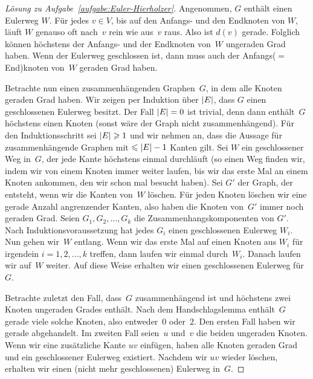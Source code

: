 \begin{proof}[Lösung zu Aufgabe~\ref{aufgabe:Euler-Hierholzer}]
	Angenommen, $G$ enthält einen Eulerweg $W$. Für jedes $v\in V$, bis auf den Anfangs- und den Endknoten von $W$, läuft $W$ genauso oft nach~$v$ rein wie aus~$v$ raus. Also ist $d(v)$ gerade. Folglich können höchstens der Anfangs- und der Endknoten von~$W$ ungeraden Grad haben. Wenn der Eulerweg geschlossen ist, dann muss auch der Anfangs($=$End)knoten von~$W$ geraden Grad haben.
	
	Betrachte nun einen zusammenhängenden Graphen~$G$, in dem alle Knoten geraden Grad haben. Wir zeigen per Induktion über $\abs*{E}$, dass $G$ einen geschlossenen Eulerweg besitzt. Der Fall $\abs*{E}=0$ ist trivial, denn dann enthält~$G$ höchstens einen Knoten (sonst wäre der Graph nicht zusammenhängend). Für den Induktionsschritt sei $\abs*{E}\geqslant 1$ und wir nehmen an, dass die Aussage für zusammenhängende Graphen mit $\leqslant\abs*{E}-1$ Kanten gilt. Sei $W$ ein geschlossener Weg in~$G$, der jede Kante höchstens einmal durchläuft (so einen Weg finden wir, indem wir von einem Knoten immer weiter laufen, bis wir das erste Mal an einem Knoten ankommen, den wir schon mal besucht haben). Sei $G'$ der Graph, der entsteht, wenn wir die Kanten von~$W$ löschen. Für jeden Knoten löschen wir eine gerade Anzahl angrenzender Kanten, also haben die Knoten von~$G'$ immer noch geraden Grad. Seien $G_1,G_2,\dotsc,G_k$ die Zusammenhangskomponenten von $G'$. Nach Induktionsvoraussetzung hat jedes $G_i$ einen geschlossenen Eulerweg $W_i$. Nun gehen wir~$W$ entlang. Wenn wir das erste Mal auf einen Knoten aus $W_i$ für irgendein $i=1,2,\dotsc,k$ treffen, dann laufen wir einmal durch~$W_i$. Danach laufen wir auf~$W$ weiter. Auf diese Weise erhalten wir einen geschlossenen Eulerweg für~$G$.
	
	Betrachte zuletzt den Fall, dass~$G$ zusammenhängend ist und höchstens zwei Knoten ungeraden Grades enthält. Nach dem Handschlagslemma enthält~$G$ gerade viele solche Knoten, also entweder~$0$ oder~$2$. Den ersten Fall haben wir gerade abgehandelt. Im zweiten Fall seien~$u$ und~$v$ die beiden ungeraden Knoten. Wenn wir eine zusätzliche Kante $uv$ einfügen, haben alle Knoten geraden Grad und ein geschlossener Eulerweg existiert. Nachdem wir $uv$ wieder löschen, erhalten wir einen (nicht mehr geschlossenen) Eulerweg in~$G$.
\end{proof}
